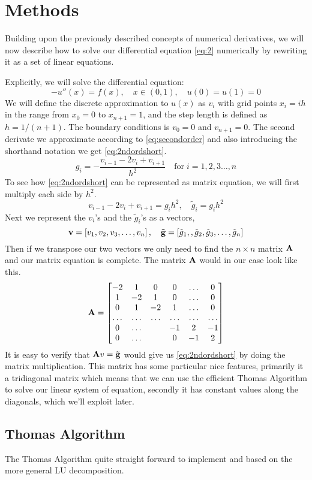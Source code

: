 \section*{Methods} 
Building upon the previously described concepts of numerical derivatives, we will now describe how to solve our differential
equation \cref{eq:2}  numerically by rewriting it as a set of linear equations.
\par
Explicitly, we will solve the differential equation:
\begin{equation*}
  -u''(x) = f(x), \quad x \in (0,1), \quad u(0)=u(1)=0 
\end{equation*} 
We will define the discrete approximation to $u(x)$ as $v_i$ with grid points
$x_i = ih$ in the range from $x_0 = 0$ to $x_{n +1} = 1$, and the step length is
defined as $h = 1/(n+1)$. The boundary conditions is $v_0 = 0$ and 
$v_{n+1} = 0$. The second derivate we approximate according to
\cref{eq:secondorder} and also introducing the shorthand notation we get \cref{eq:2ndordshort}.  
\begin{equation}\label{eq:2ndordshort}
  g_i = -\frac{v_{i-1}-2v_i + v_{i+1}}{h^2} \quad \mathrm{for} \; i = 1,2,3 \dots , n
\end{equation}  
To see how \cref{eq:2ndordshort} can be represented as matrix equation, we will
first multiply each side by $h^2$.
\begin{equation*}
  v_{i-1} -2v_{i} + v_{i+1} = g_i h^2, \quad  \tilde{g}_i = g_i h^2
\end{equation*} 
Next we represent the $v_i$'s and the $\tilde{g}_i$'s as a vectors,
\begin{equation*}
  \mathbf{v} = \left[v_1, v_2, v_3 ,\dots, v_{n}\right], \quad 
  \mathbf{\tilde{g}} = \left[\tilde{g}_1,, \tilde{g}_2, \tilde{g}_3,
  \dots, \tilde{g}_{n} \right]
\end{equation*}  
Then if we transpose our two vectors we only need to find the $n\times n$ matrix
$\mathbf{A}$ and our matrix equation is complete. The matrix $\mathbf{A}$ would in
our case look like this.
\begin{equation*}
  \mathbf{A} = 
  \begin{bmatrix}
    -2 & 1 & 0 & 0 &\dots & 0 \\
     1 & -2 & 1 & 0 & \dots & 0 \\
     0 & 1 & -2 & 1 & \dots & 0  \\
     \dots & \dots & \dots & \dots & \dots & \dots \\
     0 & \dots & & -1 & 2 & -1 \\
     0 & \dots & & 0 & -1 & 2
  \end{bmatrix}
\end{equation*}
It is easy to verify that $\mathbf{A} v = \mathbf{\tilde{g}}$ would give us 
\cref{eq:2ndordshort} by doing the matrix multiplication. This matrix has some
particular nice features, primarily it a tridiagonal matrix which means that we
can use the efficient Thomas Algorithm to solve our linear system of equation,
secondly it has constant values along the diagonals, which we'll exploit later.    
\subsection*{Thomas Algorithm}
The Thomas Algorithm quite straight forward to implement and based on the more
general LU decomposition. 